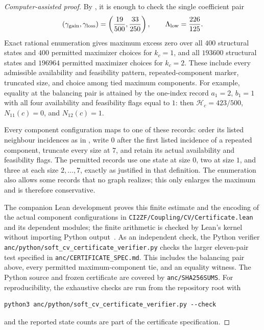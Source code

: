 \begin{proof}[Computer-assisted proof]
By , it is enough to check the single
coefficient pair
\[
 (\gamma_{\rm gain},\gamma_{\rm loss})
   =\left(\frac{19}{500},\frac{33}{250}\right),
 \qquad \Lambda_{\rm low}=\frac{226}{125}.
\]
Exact rational enumeration gives maximum excess zero over all $400$
structural states and $400$ permitted maximizer choices for $k_c=1$, and
all $193600$ structural states and $196964$ permitted maximizer choices for
$k_c=2$.  These include every admissible availability and feasibility
pattern, repeated-component marker, truncated size, and choice among tied
maximum components.
For example, equality at the balancing pair is attained by the one-index
record $a_1=2$, $b_1=1$ with all four availability and feasibility flags
equal to $1$: then $\mathcal H_c=423/500$, $N_{11}(c)=0$, and
$N_{12}(c)=1$.

Every component configuration maps to one of these records: order its listed
neighbour incidences as in , write $0$ after the
first listed incidence of a repeated component, truncate every size at $7$, and retain
its actual availability and feasibility flags.  The permitted records use
one state at size $0$, two at size $1$, and three at each size
$2,\ldots,7$, exactly as justified in that definition.  The enumeration
also allows some records that no graph realizes; this only enlarges the
maximum and is therefore conservative.

The companion Lean development proves this finite estimate and the
encoding of the actual component configurations in
\nolinkurl{CI2ZF/Coupling/CV/Certificate.lean} and its dependent modules;
the finite arithmetic is checked by Lean's kernel without importing
Python output~\cite{Shi2026Formalization}.
As an independent check, the Python verifier
\nolinkurl{anc/python/soft_cv_certificate_verifier.py} checks the larger
eleven-pair test specified in \texttt{anc/CERTIFICATE\_SPEC.md}.
This includes the balancing pair above, every permitted maximum-component
tie, and an equality witness.  The Python source and
frozen certificate are covered by \texttt{anc/SHA256SUMS}.
For reproducibility, the exhaustive checks are run from the repository root with
\begin{verbatim}
python3 anc/python/soft_cv_certificate_verifier.py --check
\end{verbatim}
and the reported state counts are part of the certificate specification.
\end{proof}

